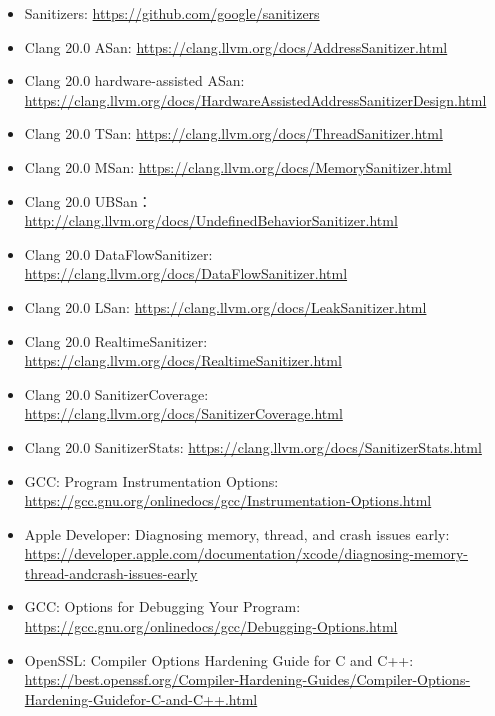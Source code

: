 

\begin{itemize}
\item
Sanitizers: \url{https://github.com/google/sanitizers}

\item
Clang 20.0 ASan: \url{https://clang.llvm.org/docs/AddressSanitizer.html}

\item
Clang 20.0 hardware-assisted ASan: \url{https://clang.llvm.org/docs/HardwareAssistedAddressSanitizerDesign.html}

\item
Clang 20.0 TSan: \url{https://clang.llvm.org/docs/ThreadSanitizer.html}

\item
Clang 20.0 MSan: \url{https://clang.llvm.org/docs/MemorySanitizer.html}

\item
Clang 20.0 UBSan： \url{http://clang.llvm.org/docs/UndefinedBehaviorSanitizer.html}

\item
Clang 20.0 DataFlowSanitizer: \url{https://clang.llvm.org/docs/DataFlowSanitizer.html}

\item
Clang 20.0 LSan: \url{https://clang.llvm.org/docs/LeakSanitizer.html}

\item
Clang 20.0 RealtimeSanitizer: \url{https://clang.llvm.org/docs/RealtimeSanitizer.html}

\item
Clang 20.0 SanitizerCoverage: \url{https://clang.llvm.org/docs/SanitizerCoverage.html}

\item
Clang 20.0 SanitizerStats: \url{https://clang.llvm.org/docs/SanitizerStats.html}

\item
GCC: Program Instrumentation Options: \url{https://gcc.gnu.org/onlinedocs/gcc/Instrumentation-Options.html}

\item
Apple Developer: Diagnosing memory, thread, and crash issues early: \url{https://developer.apple.com/documentation/xcode/diagnosing-memory-thread-andcrash-issues-early}

\item
GCC: Options for Debugging Your Program: \url{https://gcc.gnu.org/onlinedocs/gcc/Debugging-Options.html}

\item
OpenSSL: Compiler Options Hardening Guide for C and C++: \url{https://best.openssf.org/Compiler-Hardening-Guides/Compiler-Options-Hardening-Guidefor-C-and-C++.html}


\end{itemize}
